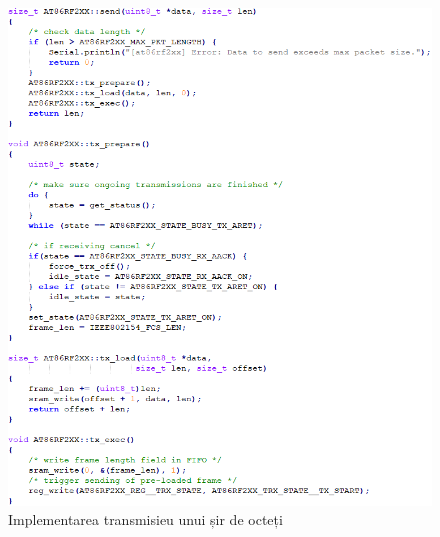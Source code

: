 \documentclass[12pt,a4paper]{report}
\begin{document}
\begin{figure}[h]
\centering
\includegraphics[scale=0.68]{pics/send.png}
  \caption{Implementarea transmisieu unui șir de octeți}
  \label{fig:send}
\end{figure}\\
\end{document}

